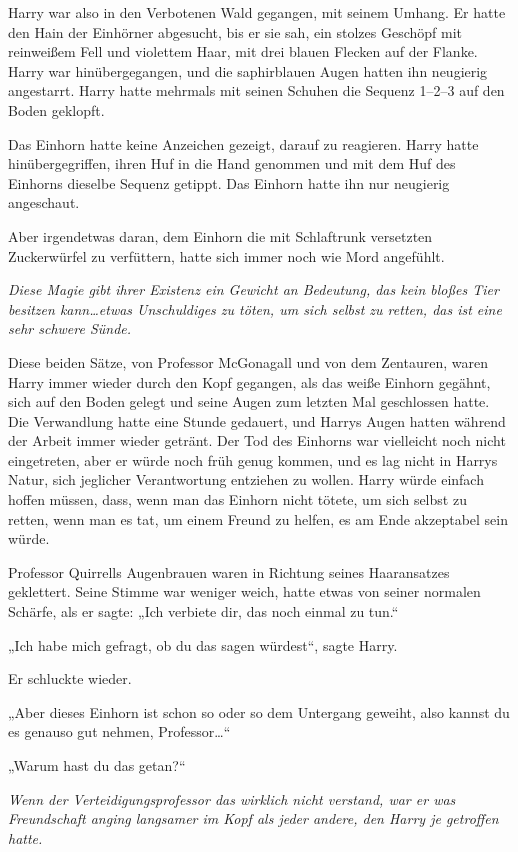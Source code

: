 {Harry war also in den Verbotenen Wald gegangen, mit seinem Umhang. Er hatte den Hain der Einhörner abgesucht, bis er sie sah, ein stolzes Geschöpf mit reinweißem Fell und violettem Haar, mit drei blauen Flecken auf der Flanke. Harry war hinübergegangen, und die saphirblauen Augen hatten ihn neugierig angestarrt. Harry hatte mehrmals mit seinen Schuhen die Sequenz 1–2–3 auf den Boden geklopft.

Das Einhorn hatte keine Anzeichen gezeigt, darauf zu reagieren. Harry hatte hinübergegriffen, ihren Huf in die Hand genommen und mit dem Huf des Einhorns dieselbe Sequenz getippt. Das Einhorn hatte ihn nur neugierig angeschaut.

Aber irgendetwas daran, dem Einhorn die mit Schlaftrunk versetzten Zuckerwürfel zu verfüttern, hatte sich immer noch wie Mord angefühlt.

\emph{Diese Magie gibt ihrer Existenz ein Gewicht an Bedeutung, das kein bloßes Tier besitzen kann…etwas Unschuldiges zu töten, um sich selbst zu retten, das ist eine sehr schwere Sünde.}

Diese beiden Sätze, von Professor McGonagall und von dem Zentauren, waren Harry immer wieder durch den Kopf gegangen, als das weiße Einhorn gegähnt, sich auf den Boden gelegt und seine Augen zum letzten Mal geschlossen hatte. Die Verwandlung hatte eine Stunde gedauert, und Harrys Augen hatten während der Arbeit immer wieder getränt. Der Tod des Einhorns war vielleicht noch nicht eingetreten, aber er würde noch früh genug kommen, und es lag nicht in Harrys Natur, sich jeglicher Verantwortung entziehen zu wollen. Harry würde einfach hoffen müssen, dass, wenn man das Einhorn nicht tötete, um sich selbst zu retten, wenn man es tat, um einem Freund zu helfen, es am Ende akzeptabel sein würde.

Professor Quirrells Augenbrauen waren in Richtung seines Haaransatzes geklettert. Seine Stimme war weniger weich, hatte etwas von seiner normalen Schärfe, als er sagte: „Ich verbiete dir, das noch einmal zu tun.“

„Ich habe mich gefragt, ob du das sagen würdest“, sagte Harry.

Er schluckte wieder.

„Aber dieses Einhorn ist schon so oder so dem Untergang geweiht, also kannst du es genauso gut nehmen, Professor…“

„Warum hast du das getan?“

\emph{Wenn der Verteidigungsprofessor das wirklich nicht verstand, war er was Freundschaft anging langsamer im Kopf als jeder andere, den Harry je getroffen hatte.}

}
